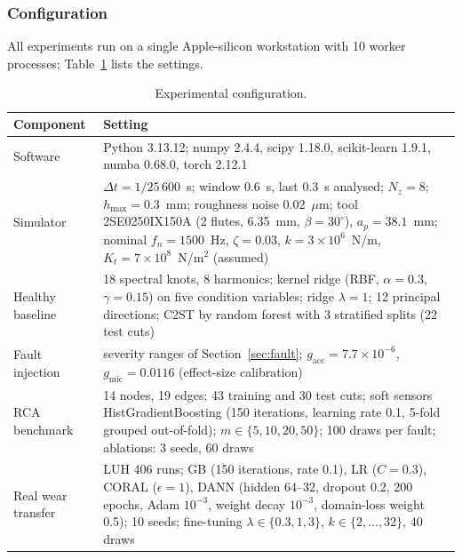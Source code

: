 \documentclass[11pt]{article}
\begin{document}
\subsubsection{Configuration}
All experiments run on a single Apple-silicon workstation with 10 worker processes; Table~\ref{tab:config} lists the settings.
\begin{table}[t]\centering\footnotesize
\caption{Experimental configuration.}\label{tab:config}
\begin{tabular}{p{2.6cm}p{12.2cm}}\toprule
Component & Setting\\\midrule
Software & Python 3.13.12; numpy 2.4.4, scipy 1.18.0, scikit-learn 1.9.1, numba 0.68.0, torch 2.12.1\\
Simulator & $\Delta t=1/25\,600$~s; window 0.6~s, last 0.3~s analysed; $N_z{=}8$; $h_{\max}{=}0.3$~mm; roughness noise 0.02~$\mu$m; tool 2SE0250IX150A (2 flutes, 6.35~mm, $\beta{=}30^\circ$), $a_p{=}38.1$~mm; nominal $f_n{=}1500$~Hz, $\zeta{=}0.03$, $k{=}3\times10^6$~N/m, $K_t{=}7\times10^8$~N/m$^2$ (assumed)\\
Healthy baseline & 18 spectral knots, 8 harmonics; kernel ridge (RBF, $\alpha{=}0.3$, $\gamma{=}0.15$) on five condition variables; ridge $\lambda{=}1$; 12 principal directions; C2ST by random forest with 3 stratified splits (22 test cuts)\\
Fault injection & severity ranges of Section~\ref{sec:fault}; $g_\text{acc}=7.7\times10^{-6}$, $g_\text{mic}=0.0116$ (effect-size calibration)\\
RCA benchmark & 14 nodes, 19 edges; 43 training and 30 test cuts; soft sensors HistGradientBoosting (150 iterations, learning rate 0.1, 5-fold grouped out-of-fold); $m\in\{5,10,20,50\}$; 100 draws per fault; ablations: 3 seeds, 60 draws\\
Real wear transfer & LUH 406 runs; GB (150 iterations, rate 0.1), LR ($C{=}0.3$), CORAL ($\epsilon{=}1$), DANN (hidden 64--32, dropout 0.2, 200 epochs, Adam $10^{-3}$, weight decay $10^{-3}$, domain-loss weight 0.5); 10 seeds; fine-tuning $\lambda\in\{0.3,1,3\}$, $k\in\{2,\dots,32\}$, 40 draws\\\bottomrule
\end{tabular}
\end{table}
\end{document}
